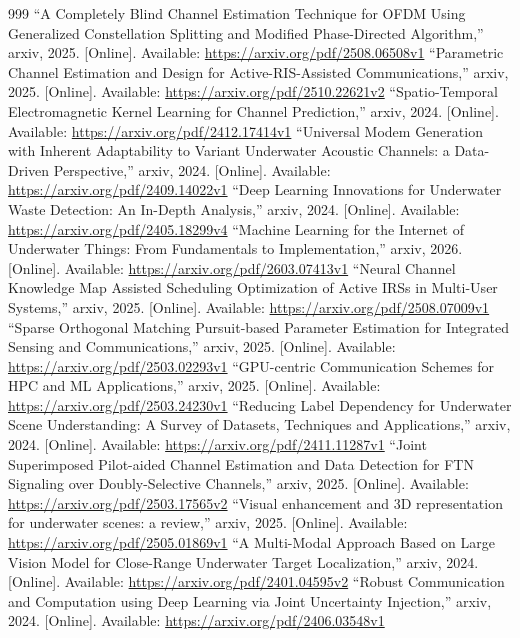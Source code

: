 \documentclass[10pt,journal]{IEEEtran}
\begin{document}
\begin{thebibliography}{999}
 ``A Completely Blind Channel Estimation Technique for OFDM Using Generalized Constellation Splitting and Modified Phase-Directed Algorithm,'' arxiv, 2025. [Online]. Available: \url{https://arxiv.org/pdf/2508.06508v1}
 ``Parametric Channel Estimation and Design for Active-RIS-Assisted Communications,'' arxiv, 2025. [Online]. Available: \url{https://arxiv.org/pdf/2510.22621v2}
 ``Spatio-Temporal Electromagnetic Kernel Learning for Channel Prediction,'' arxiv, 2024. [Online]. Available: \url{https://arxiv.org/pdf/2412.17414v1}
 ``Universal Modem Generation with Inherent Adaptability to Variant Underwater Acoustic Channels: a Data-Driven Perspective,'' arxiv, 2024. [Online]. Available: \url{https://arxiv.org/pdf/2409.14022v1}
 ``Deep Learning Innovations for Underwater Waste Detection: An In-Depth Analysis,'' arxiv, 2024. [Online]. Available: \url{https://arxiv.org/pdf/2405.18299v4}
 ``Machine Learning for the Internet of Underwater Things: From Fundamentals to Implementation,'' arxiv, 2026. [Online]. Available: \url{https://arxiv.org/pdf/2603.07413v1}
 ``Neural Channel Knowledge Map Assisted Scheduling Optimization of Active IRSs in Multi-User Systems,'' arxiv, 2025. [Online]. Available: \url{https://arxiv.org/pdf/2508.07009v1}
 ``Sparse Orthogonal Matching Pursuit-based Parameter Estimation for Integrated Sensing and Communications,'' arxiv, 2025. [Online]. Available: \url{https://arxiv.org/pdf/2503.02293v1}
 ``GPU-centric Communication Schemes for HPC and ML Applications,'' arxiv, 2025. [Online]. Available: \url{https://arxiv.org/pdf/2503.24230v1}
 ``Reducing Label Dependency for Underwater Scene Understanding: A Survey of Datasets, Techniques and Applications,'' arxiv, 2024. [Online]. Available: \url{https://arxiv.org/pdf/2411.11287v1}
 ``Joint Superimposed Pilot-aided Channel Estimation and Data Detection for FTN Signaling over Doubly-Selective Channels,'' arxiv, 2025. [Online]. Available: \url{https://arxiv.org/pdf/2503.17565v2}
 ``Visual enhancement and 3D representation for underwater scenes: a review,'' arxiv, 2025. [Online]. Available: \url{https://arxiv.org/pdf/2505.01869v1}
 ``A Multi-Modal Approach Based on Large Vision Model for Close-Range Underwater Target Localization,'' arxiv, 2024. [Online]. Available: \url{https://arxiv.org/pdf/2401.04595v2}
 ``Robust Communication and Computation using Deep Learning via Joint Uncertainty Injection,'' arxiv, 2024. [Online]. Available: \url{https://arxiv.org/pdf/2406.03548v1}

\end{thebibliography}
\end{document}
